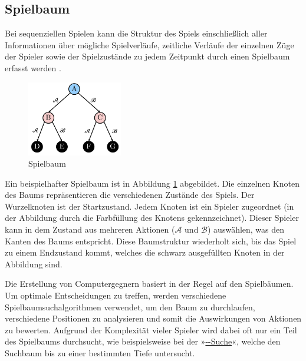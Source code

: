 \subsection{Spielbaum}

Bei sequenziellen Spielen kann die Struktur des Spiels einschließlich aller Informationen über mögliche Spielverläufe, zeitliche Verläufe der einzelnen Züge der Spieler sowie der Spielzustände zu jedem Zeitpunkt durch einen Spielbaum erfasst werden \cite[S. 13]{2005.SpieltheorieEinführung}.

\begin{figure}
    \centering
    \includegraphics[width=0.37\textwidth]{res/pictures/game-tree.pdf}
    \caption{Spielbaum}
    \label{fig:spielbaum}
    \vspace*{0.5cm}
\end{figure}

Ein beispielhafter Spielbaum ist in Abbildung \ref{fig:spielbaum} abgebildet. Die einzelnen Knoten des Baums repräsentieren die verschiedenen Zustände des Spiels. Der Wurzelknoten ist der Startzustand. Jedem Knoten ist ein Spieler zugeordnet (in der Abbildung durch die Farbfüllung des Knotens gekennzeichnet). Dieser Spieler kann in dem Zustand aus mehreren Aktionen ($\mathcal{A}$ und $\mathcal{B}$) auswählen, was den Kanten des Baums entspricht. Diese Baumstruktur wiederholt sich, bis das Spiel zu einem Endzustand kommt, welches die schwarz ausgefüllten Knoten in der Abbildung sind. \cite[S. 54]{2014.GameTheoryThroughExamples}

Die Erstellung von Computergegnern basiert in der Regel auf den Spielbäumen. Um optimale Entscheidungen zu treffen, werden verschiedene Spielbaumsuchalgorithmen verwendet, um den Baum zu durchlaufen, verschiedene Positionen zu analysieren und somit die Auswirkungen von Aktionen zu bewerten. Aufgrund der Komplexität vieler Spieler wird dabei oft nur ein Teil des Spielbaums durchsucht, wie beispielsweise bei der »\hyperref[chapter:minimax-algorithmus]{\alpha-\beta-Suche}«, welche den Suchbaum bis zu einer bestimmten Tiefe untersucht. \cite[S. 15]{1194.SearchAndAiInGames}


